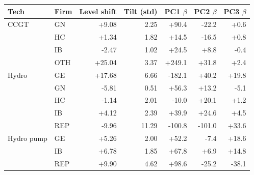 \begin{tabular}{l l r r r r r}
\toprule
Tech & Firm & Level shift & Tilt (std) & PC1 $\beta$ & PC2 $\beta$ & PC3 $\beta$ \\
\midrule
CCGT & GN & +9.08 & 2.25 & +90.4 & -22.2 & +0.6 \\
 & HC & +1.34 & 1.82 & +14.5 & -16.5 & +0.8 \\
 & IB & -2.47 & 1.02 & +24.5 & +8.8 & -0.4 \\
 & OTH & +25.04 & 3.37 & +249.1 & +31.8 & +2.4 \\
\addlinespace
Hydro & GE & +17.68 & 6.66 & -182.1 & +40.2 & +19.8 \\
 & GN & -5.81 & 0.51 & +56.3 & +13.2 & -5.1 \\
 & HC & -1.14 & 2.01 & -10.0 & +20.1 & +1.2 \\
 & IB & +4.12 & 2.39 & +39.9 & +24.6 & +4.5 \\
 & REP & -9.96 & 11.29 & -100.8 & -101.0 & +33.6 \\
\addlinespace
Hydro pump & GE & +5.26 & 2.00 & +52.2 & -7.4 & +18.6 \\
 & IB & +6.78 & 1.85 & +67.8 & +6.9 & +14.8 \\
 & REP & +9.90 & 4.62 & +98.6 & -25.2 & -38.1 \\
\bottomrule
\end{tabular}